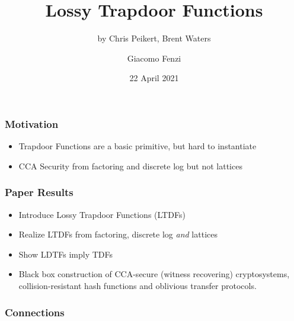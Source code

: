 \documentclass{beamer}
\title{Lossy Trapdoor Functions}
\subtitle{by Chris Peikert, Brent Waters}
\author{Giacomo Fenzi}
\institute{ETH Zurich}
\date{22 April 2021}
\begin{document}
\frame{\titlepage}

\begin{frame}
    \frametitle{Motivation}
    \begin{itemize}
        \item Trapdoor Functions are a basic primitive, but hard to instantiate
        \item CCA Security from factoring and discrete log but not lattices
    \end{itemize}


\end{frame}


\begin{frame}
    \frametitle{Paper Results}
    \begin{itemize}
        \item Introduce Lossy Trapdoor Functions (LTDFs)
        \item Realize LTDFs from factoring, discrete log \textit{and} lattices
        \item Show LDTFs imply TDFs
        \item Black box construction of CCA-secure (witness recovering) cryptosystems,
              collision-resistant hash functions and oblivious transfer protocols.
    \end{itemize}
\end{frame}

\begin{frame}
    \frametitle{Connections}
    \begin{center}
    \end{center}
\end{frame}
\end{document}
